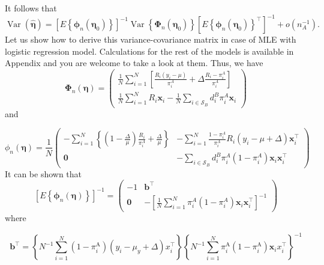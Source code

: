 \documentclass[
  letterpaper,
  DIV=11,
  numbers=noendperiod]{scrreprt}
\begin{document}
It follows that \[
\begin{equation}
\operatorname{Var}(\hat{\boldsymbol{\eta}})=\left[E\left\{\boldsymbol{\phi}_n\left(\boldsymbol{\eta}_0\right)\right\}\right]^{-1} \operatorname{Var}\left\{\boldsymbol{\Phi}_n\left(\boldsymbol{\eta}_0\right)\right\}\left[E\left\{\boldsymbol{\phi}_n\left(\boldsymbol{\eta}_0\right)\right\}^{\top}\right]^{-1}+o\left(n_A^{-1}\right).
\end{equation}
\] Let us show how to derive this variance-covariance matrix in case of
MLE with logistic regression model. Calculations for the rest of the
models is available in Appendix and you are welcome to take a look at
them. Thus, we have \[
\boldsymbol{\Phi}_n(\boldsymbol{\eta})=\left(\begin{array}{c}
\frac{1}{N} \sum_{i=1}^N\left[\frac{R_i\left(y_i-\mu\right)}{\pi_i^A}+\Delta \frac{R_i-\pi_i^A}{\pi_i^A}\right] \\
\frac{1}{N} \sum_{i=1}^N R_i \boldsymbol{x}_i-\frac{1}{N} \sum_{i \in \mathcal{S}_B} d_i^B \pi_i^A \boldsymbol{x}_i
\end{array}\right)
\] and

\[
\phi_n(\boldsymbol{\eta})=\frac{1}{N}\left(\begin{array}{cc}
-\sum_{i=1}^N\left\{\left(1-\frac{\Delta}{\mu}\right) \frac{R_i}{\pi_i^A}+\frac{\Delta}{\mu}\right\} & -\sum_{i=1}^N \frac{1-\pi_i^A}{\pi_i^A} R_i\left(y_i-\mu+\Delta\right) \boldsymbol{x}_i^{\top} \\
\mathbf{0} & -\sum_{i \in \mathcal{S}_B} d_i^B \pi_i^A\left(1-\pi_i^A\right) \boldsymbol{x}_i \boldsymbol{x}_i^{\top}
\end{array}\right)
\] It can be shown that \[
\left[E\left\{\boldsymbol{\phi}_n(\boldsymbol{\eta})\right\}\right]^{-1}=\left(\begin{array}{cc}
-1 &  \mathbf{b}^{\top} \\
\mathbf{0} & -\left[\frac{1}{N} \sum_{i=1}^N \pi_i^A\left(1-\pi_i^A\right) \boldsymbol{x}_i \boldsymbol{x}_i^{\top}\right]^{-1}
\end{array}\right)
\] where

\[
\mathbf{b}^{\top} = 
\left\{N^{-1} \sum_{i=1}^N\left(1-\pi_i^{\mathrm{A}}\right) \left(y_i-\mu_y + \Delta\right) x_i^{\top}\right\}\left\{N^{-1} \sum_{i=1}^N \pi_i^{\mathrm{A}}\left(1-\pi_i^{\mathrm{A}}\right) \boldsymbol{x}_i x_i^{\top}\right\}^{-1}
\]
\end{document}
